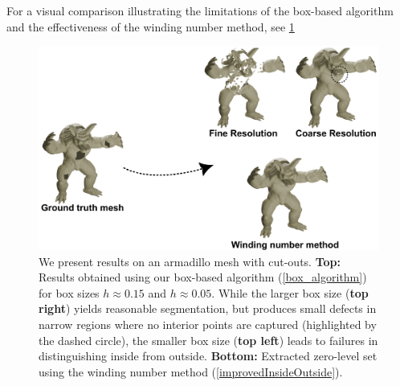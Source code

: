 \documentclass[12pt,openany]{book}
\theoremstyle{plainnormal}
\theoremstyle{remark}
\begin{document}
    For a visual comparison illustrating the limitations of the box-based algorithm and the effectiveness of the winding number method, see \cref{Winding_fig}
\begin{figure}[!t]
    \centering
    \includegraphics[width=\linewidth]{Figures/WindingNumberFig.pdf}
    \caption{We present results on an armadillo mesh with cut-outs. \textbf{Top:} Results obtained using our box-based algorithm (\cref{box_algorithm}) for box sizes $h \approx 0.15$ and $h \approx 0.05$. While the larger box size (\textbf{top right}) yields reasonable segmentation, but produces small defects in narrow regions where no interior points are captured (highlighted by the dashed circle), the smaller box size (\textbf{top left}) leads to failures in distinguishing inside from outside. \textbf{Bottom:} Extracted zero-level set using the winding number method (\cref{improvedInsideOutside}).
}
    \label{Winding_fig}
\end{figure}
\end{document}
